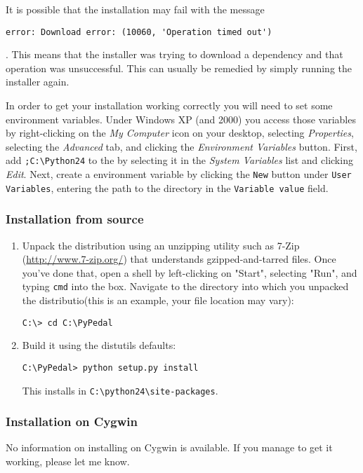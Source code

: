 It is possible that the installation may fail with the message \begin{verbatim}error: Download error: (10060, 'Operation timed out')\end{verbatim}. This means that the installer was trying to download a dependency and that operation was unsuccessful. This can usually be remedied by simply running the installer again.

In order to get your installation working correctly you will need to set some environment variables.  Under Windows XP (and 2000) you access those variables by right-clicking on the \emph{My Computer} icon on your desktop, selecting \emph{Properties}, selecting the \emph{Advanced} tab, and clicking the \emph{Environment Variables} button. First, add \texttt{;C:\textbackslash{}Python24} to the  by selecting it in the \emph{System Variables} list and clicking \emph{Edit}. Next, create a  environment variable by clicking the \texttt{New} button under \texttt{User Variables}, entering the path to the \PyPedal{} directory in the \texttt{Variable value} field.

\subsubsection{Installation from source}\label{sec:installation-from-source}
\begin{enumerate}
\item Unpack the distribution using an unzipping utility such as 7-Zip (\url{http://www.7-zip.org/}) that understands gzipped-and-tarred files. Once you've done that, open a shell by left-clicking on "Start", selecting "Run", and typing \texttt{cmd} into the box. Navigate to the directory into which you unpacked the \PyPedal{} distributio(this is an example, your file location may vary):
\begin{verbatim}
C:\> cd C:\PyPedal
\end{verbatim}
\item Build it using the distutils defaults:
\begin{verbatim}
C:\PyPedal> python setup.py install
\end{verbatim}
This installs \PyPedal{} in \texttt{C:\textbackslash{}python24\textbackslash{}site-packages}.
\end{enumerate}

\subsubsection{Installation on Cygwin} \label{sec:installation-cygwin}
No information on installing \PyPedal{} on Cygwin is available.  If you manage to get it working, please let me know.

